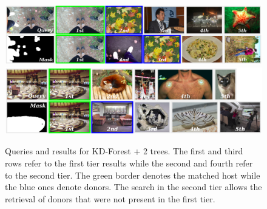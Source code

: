 \begin{figure}[t]
	\begin{center}
	\includegraphics[width=0.8\linewidth]{qualitative_results_example_1.png}
	\vspace{0.3cm}
	\includegraphics[width=0.8\linewidth]{qualitative_results_example_3.png}
	\caption{Queries and results for KD-Forest + 2 trees. The first and third rows refer to the first tier results while the second and fourth refer to the second tier. The green border denotes the matched host while the blue ones denote donors. The search in the second tier allows the retrieval of donors that were not present in the first tier.\label{fig:qualitative}}	
	\end{center}	
\end{figure}
